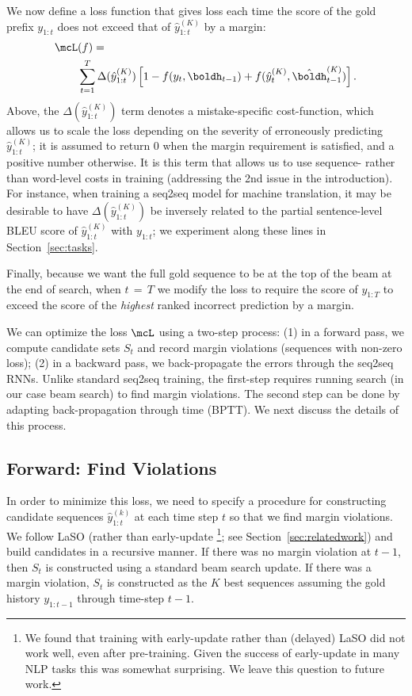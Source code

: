 \documentclass[11pt,letterpaper]{article}
\newcommand{\goldpfx}[1]{\ensuremath{y_{1:{#1}}}}
\newcommand{\beampred}[2]{\ensuremath{\hat{y}_{1:{#1}}^{({#2})}}}
\newcommand{\niceq}{\ensuremath{\,{=}\,}}
\begin{document}
We now define a loss function that gives loss each time the score of
the gold prefix $\goldpfx{t}$ does not exceed that of
$\beampred{t}{K}$ by a margin:
\begin{align*}
 \mcL&(f) = \\
 &\sum_{t=1}^T \Delta(\beampred{t}{K}) \left[1 - f(y_t, \boldh_{t-1}) + f(\hat{y}_t^{(K)},\hat{\boldh}_{t-1}^{(K)}) \right] .
\end{align*}
Above, the $\Delta(\beampred{t}{K})$ term denotes a
mistake-specific cost-function, which allows us to scale the loss
depending on the severity of erroneously predicting $\beampred{t}{K}$;
it is assumed to return 0 when the margin requirement is satisfied,
and a positive number otherwise. It is this term that allows us to use sequence- rather than word-level costs in training (addressing the 2nd issue in the introduction). For instance, when training a seq2seq model for machine translation, it may be desirable to have $\Delta(\beampred{t}{K})$ be inversely related to the partial sentence-level BLEU score of $\beampred{t}{K}$ with $\goldpfx{t}$; we experiment along these lines in Section~\ref{sec:tasks}. 

Finally, because we want the full gold sequence to be at the top of the beam at the end of search, when $t \niceq T$ we modify the loss to require the score of $\goldpfx{T}$ to exceed the score of the \textit{highest} ranked incorrect prediction by a margin.

We can optimize the loss $\mcL$ using a two-step process: (1) in a forward pass, we compute candidate sets $S_t$ and record margin violations (sequences with non-zero loss); (2) in a backward pass, we back-propagate the errors through the seq2seq RNNs.
Unlike standard seq2seq training, the first-step requires running
search (in our case beam search) to find margin violations. The second
step can be done by adapting back-propagation through time (BPTT). 
We next discuss the details of this process.






\subsection{Forward: Find Violations} 
\label{sec:forward}
In order to minimize this loss, we need to specify a procedure for
constructing candidate sequences $\beampred{t}{k}$ at each time step
$t$ so that we find margin violations. We follow LaSO (rather than
early-update \footnote{We found that training with early-update rather than (delayed)
LaSO did not work well, even after pre-training. Given the success of early-update
in many NLP tasks this was somewhat surprising. We leave this question to future work.}; see Section~\ref{sec:relatedwork}) and build candidates
in a recursive manner. If there was no margin violation at $t{-}1$,
then $S_t$ is constructed using a standard beam search update. If
there was a margin violation, $S_t$ is constructed as the $K$ best
sequences assuming the gold history $y_{1:t-1}$ through time-step $t{-}1$.
\end{document}
